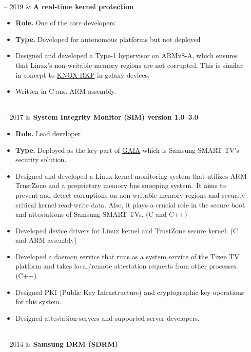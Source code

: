 \documentclass[10pt, a4paper]{article}
\newcommand{\Duration}[2]{\fontsize{9pt}{0}\selectfont #1 -- #2}
\begin{document}
\begin{EntriesTable}
\begin{itemize}
  \end{itemize}
  \\
  \Duration{2018}{2019}  &
  \textbf{A real-time kernel protection}
  \begin{itemize}
    \item \textbf{Role.} One of the core developers
    \item \textbf{Type.} Developed for autonomous platforms but not deployed
    \item Designed and developed a Type-1 hypervisor on ARMv8-A, which ensures that Linux's non-writable memory regions are not corrupted. This is similar in concept to \href{https://www.samsungknox.com/en/blog/real-time-kernel-protection-rkp}{KNOX RKP} in galaxy devices.
    \item Written in C and ARM assembly.
  \end{itemize}
  \\
  \Duration{2014}{2017}  &
  \textbf{System Integrity Monitor (SIM) version 1.0--3.0}
  \begin{itemize}
    \item \textbf{Role.} Lead developer
    \item \textbf{Type.} Deployed as the key part of \href{https://news.samsung.com/global/samsung-electronics-announces-gaia-a-powerful-smart-tv-security-solution-for-2016-and-beyond}{GAIA} which is Samsung SMART TV's security solution.
    \item Designed and developed a Linux kernel monitoring system that utilizes ARM TrustZone and a proprietary memory bus snooping system.\
      It aims to prevent and detect corruptions on non-writable memory regions and security-critical kernel read-write data. Also, it plays a crucial role in the secure boot and attestations of Samsung SMART TVs. (C and C++)
    \item Developed device drivers for Linux kernel and TrustZone secure kernel. (C and ARM assembly)
    \item Developed a daemon service that runs as a system service of the Tizen TV platform and takes local/remote attestation requests from other processes. (C++)
    \item Designed PKI (Public Key Infrastructure) and cryptographic key operations for this system.
    \item Designed attestation servers and supported server developers.
  \end{itemize}
  \\
  \Duration{2013}{2014}  &
  \textbf{Samsung DRM (SDRM)}
  \begin{itemize}

\end{itemize}
\end{EntriesTable}
\end{document}
